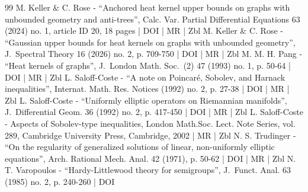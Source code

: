 \documentclass[10pt]{amsart}
\theoremstyle{plain}
\theoremstyle{definition}
\begin{document}
\begin{thebibliography}{99}
M. Keller \& C. Rose - “Anchored heat kernel upper bounds on graphs with unbounded geometry and anti-trees”, Calc. Var. Partial Differential Equations 63 (2024) no. 1, article ID 20, 18 pages | DOI | MR | Zbl
M. Keller \& C. Rose - “Gaussian upper bounds for heat kernels on graphs with unbounded geometry”, J. Spectral Theory 16 (2026) no. 2, p. 709-750 | DOI | MR | Zbl
M. M. H. Pang - “Heat kernels of graphs”, J. London Math. Soc. (2) 47 (1993) no. 1, p. 50-64 | DOI | MR | Zbl
L. Saloff-Coste - “A note on Poincaré, Sobolev, and Harnack inequalities”, Internat. Math. Res. Notices (1992) no. 2, p. 27-38 | DOI | MR | Zbl
L. Saloff-Coste - “Uniformly elliptic operators on Riemannian manifolds”, J. Differential Geom. 36 (1992) no. 2, p. 417-450 | DOI | MR | Zbl
L. Saloff-Coste - Aspects of Sobolev-type inequalities, London Math.Soc. Lect. Note Series, vol. 289, Cambridge University Press, Cambridge, 2002 | MR | Zbl
N. S. Trudinger - “On the regularity of generalized solutions of linear, non-uniformly elliptic equations”, Arch. Rational Mech. Anal. 42 (1971), p. 50-62 | DOI | MR | Zbl
N. T. Varopoulos - “Hardy-Littlewood theory for semigroups”, J. Funct. Anal. 63 (1985) no. 2, p. 240-260 | DOI
\end{thebibliography}
\end{document}
